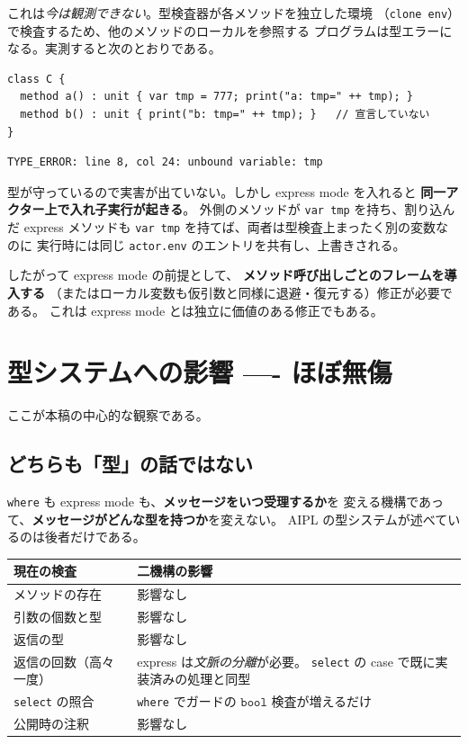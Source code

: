 \documentclass[11pt,a4paper]{ltjsarticle}
\theoremstyle{remark}
\newcommand{\ty}[1]{\ensuremath{\mathtt{#1}}}
\begin{document}
これは\emph{今は観測できない}。型検査器が各メソッドを独立した環境
（\texttt{clone env}）で検査するため、他のメソッドのローカルを参照する
プログラムは型エラーになる。実測すると次のとおりである。

\begin{lstlisting}[language=AIPL]
class C {
  method a() : unit { var tmp = 777; print("a: tmp=" ++ tmp); }
  method b() : unit { print("b: tmp=" ++ tmp); }   // 宣言していない
}
\end{lstlisting}

\begin{lstlisting}[language={}]
TYPE_ERROR: line 8, col 24: unbound variable: tmp
\end{lstlisting}

型が守っているので実害が出ていない。しかし express mode を入れると
\textbf{同一アクター上で入れ子実行が起きる}。
外側のメソッドが \texttt{var tmp} を持ち、割り込んだ express メソッドも
\texttt{var tmp} を持てば、両者は型検査上まったく別の変数なのに
実行時には同じ \texttt{actor.env} のエントリを共有し、上書きされる。

したがって express mode の前提として、
\textbf{メソッド呼び出しごとのフレームを導入する}
（またはローカル変数も仮引数と同様に退避・復元する）修正が必要である。
これは express mode とは独立に価値のある修正でもある。

\section{型システムへの影響 ---- ほぼ無傷}

ここが本稿の中心的な観察である。

\subsection{どちらも「型」の話ではない}

\texttt{where} も express mode も、\textbf{メッセージをいつ受理するか}を
変える機構であって、\textbf{メッセージがどんな型を持つか}を変えない。
AIPL の型システムが述べているのは後者だけである。

\begin{center}
\small
\begin{tabular}{@{}lp{8.4cm}@{}}
\toprule
現在の検査 & 二機構の影響 \\
\midrule
メソッドの存在       & 影響なし \\
引数の個数と型       & 影響なし \\
返信の型             & 影響なし \\
返信の回数（高々一度）& express は\emph{文脈の分離}が必要。
  \texttt{select} の case で既に実装済みの処理と同型 \\
\texttt{select} の照合 & \texttt{where} でガードの \ty{bool} 検査が増えるだけ \\
公開時の注釈         & 影響なし \\
\bottomrule
\end{tabular}
\end{center}
\end{document}
